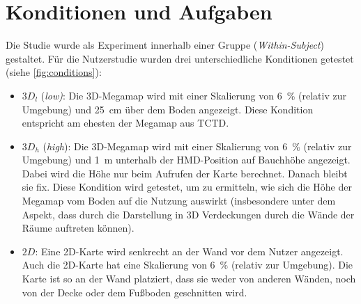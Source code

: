 \section{Konditionen und Aufgaben}
\label{sec:conditions_and_tasks}
Die Studie wurde als Experiment innerhalb einer Gruppe (\emph{Within-Subject}) gestaltet.
Für die Nutzerstudie wurden drei unterschiedliche Konditionen getestet (siehe \autoref{fig:conditions}):
\begin{itemize}
    \item $3D_l$ (\emph{low)}: Die 3D-Megamap wird mit einer Skalierung von \SI{6}{\percent} (relativ zur Umgebung) und \SI{25}{\cm} über dem Boden angezeigt.
    Diese Kondition entspricht am ehesten der Megamap aus TCTD. 
    \item $3D_h$ (\emph{high}): Die 3D-Megamap wird mit einer Skalierung von \SI{6}{\percent} (relativ zur Umgebung) und \SI{1}{\metre} unterhalb der HMD-Position auf Bauchhöhe angezeigt.
    Dabei wird die Höhe nur beim Aufrufen der Karte berechnet.
    Danach bleibt sie fix.
    Diese Kondition wird getestet, um zu ermitteln, wie sich die Höhe der Megamap vom Boden auf die Nutzung auswirkt (insbesondere unter dem Aspekt, dass durch die Darstellung in 3D Verdeckungen durch die Wände der Räume auftreten können).
    \item $2D$: Eine 2D-Karte wird senkrecht an der Wand vor dem Nutzer angezeigt.
    Auch die 2D-Karte hat eine Skalierung von \SI{6}{\percent} (relativ zur Umgebung).
    Die Karte ist so an der Wand platziert, dass sie weder von anderen Wänden, noch von der Decke oder dem Fußboden geschnitten wird.
\end{itemize}

